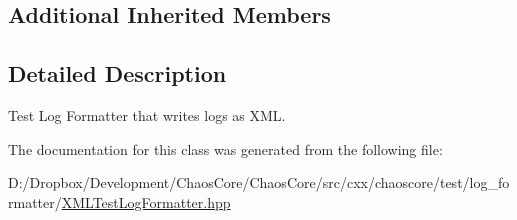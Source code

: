 \subsection*{Additional Inherited Members}


\subsection{Detailed Description}
Test Log Formatter that writes logs as X\+M\+L. 

The documentation for this class was generated from the following file\+:\begin{DoxyCompactItemize}
\item 
D\+:/\+Dropbox/\+Development/\+Chaos\+Core/\+Chaos\+Core/src/cxx/chaoscore/test/log\+\_\+formatter/\hyperlink{_x_m_l_test_log_formatter_8hpp}{X\+M\+L\+Test\+Log\+Formatter.\+hpp}\end{DoxyCompactItemize}

